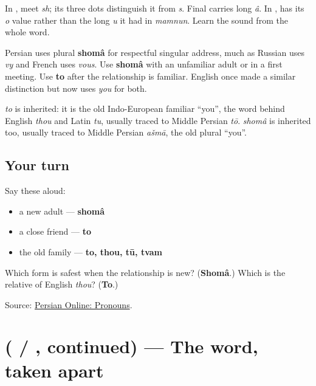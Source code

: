 In \textbf{}, meet \textbf{} \emph{sh}; its three dots distinguish it from \textbf{} \emph{s}. Final \textbf{} carries long \emph{â}. In \textbf{}, \textbf{} has its \emph{o} value rather than the long \emph{u} it had in \emph{mamnun}. Learn the sound from the whole word.

\begin{grammarlens}[title={Grammar Lens: begin respectfully}]
Persian uses plural \textbf{shomâ} for respectful singular address, much as Russian uses \emph{vy} and French uses \emph{vous}. Use \textbf{shomâ} with an unfamiliar adult or in a first meeting. Use \textbf{to} after the relationship is familiar. English once made a similar distinction but now uses \emph{you} for both.
\end{grammarlens}

\begin{cousinweb}
\emph{to} is inherited: it is the old Indo-European familiar \textquotedblleft{}you\textquotedblright{}, the word behind English \emph{thou} and Latin \emph{tu}, usually traced to Middle Persian \emph{tō}. \emph{shomâ} is inherited too, usually traced to Middle Persian \emph{ašmā}, the old plural \textquotedblleft{}you\textquotedblright{}.
\end{cousinweb}

\subsection*{Your turn}
Say these aloud:

\begin{itemize}
\raggedright
  \item a new adult — \textbf{shomâ}
  \item a close friend — \textbf{to}
  \item the old family — \textbf{to, thou, tū, tvam}
\end{itemize}

\begin{tcolorbox}[breakable,colback=teal!4,colframe=teal!35!black,title={Before you move on}]
Which form is safest when the relationship is new? (\textbf{Shomâ}.) Which is the relative of English \emph{thou}? (\textbf{To}.)

Source: \href{https://sites.la.utexas.edu/persian\_online\_resources/pronouns/}{Persian Online: Pronouns}.
\end{tcolorbox}
\section[\texorpdfstring{(\fa{شما} / \fa{تو}, continued)}{(شما / تو, continued)}]{( / , continued) — The word, taken apart}


